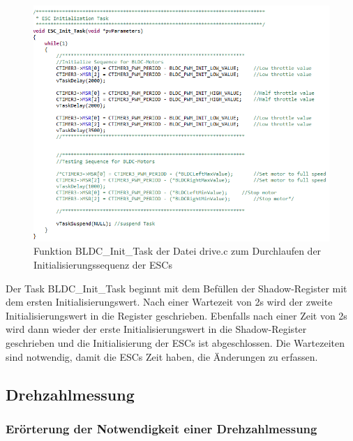 \begin{figure}[H] %
\includegraphics[width=.9\textwidth]{sec4/images/DriveC2} 
\centering
\captionsetup{width=.95\textwidth}
\caption[Funktion BLDC\_Init\_Task der Datei \glqq{}drive.c\grqq{}]{Funktion BLDC\_Init\_Task der Datei \glqq{}drive.c\grqq{} zum Durchlaufen der Initialisierungssequenz der \ac{ESC}s}\centering
\label{fig:DriveC2}
\end{figure}

Der Task BLDC\_Init\_Task beginnt mit dem Befüllen der Shadow-Register mit dem ersten Initialisierungswert. Nach einer Wartezeit von 2s wird der zweite Initialisierungswert in die Register geschrieben. Ebenfalls nach einer Zeit von 2s wird dann wieder der erste Initialisierungswert in die Shadow-Register geschrieben und die Initialisierung der \ac{ESC}s ist abgeschlossen. Die Wartezeiten sind notwendig, damit die \ac{ESC}s Zeit haben, die Änderungen zu erfassen.



\newpage
\subsection{Drehzahlmessung}\label{Sec4Sub5}

\subsubsection{Erörterung der Notwendigkeit einer Drehzahlmessung}\label{Sec:NotwendigkeitDrehzahlmessung}

